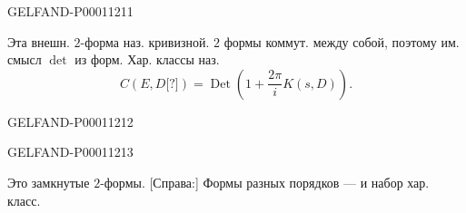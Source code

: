 \begin{GelfandAdjacentEvidence}{GELFAND-P000112}{11}

Эта внешн. $2$-форма наз. кривизной.
$2$ формы коммут. между собой, поэтому им. смысл $\det$ из форм.
Хар. классы наз.
\begin{equation*}C(E,D\text{[?]})=\operatorname{Det}\left(1+\frac{2\pi}{i}K(s,D)\right).\end{equation*}
\end{GelfandAdjacentEvidence}
\begin{GelfandAdjacentEvidence}{GELFAND-P000112}{12}

\end{GelfandAdjacentEvidence}
\begin{GelfandAdjacentEvidence}{GELFAND-P000112}{13}

Это замкнутые $2$-формы.
[Справа:] Формы разных порядков — и набор хар. класс.
\end{GelfandAdjacentEvidence}




